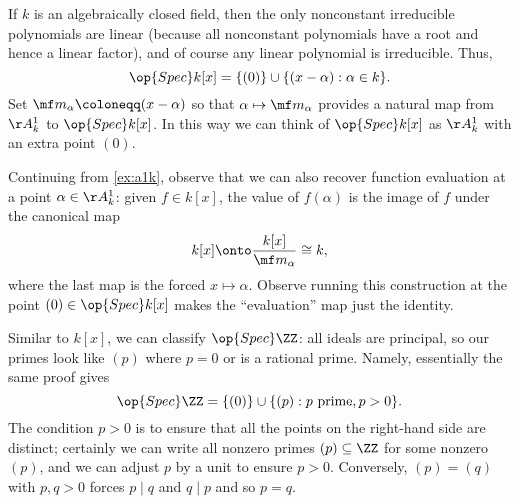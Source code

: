 \documentclass[../notes.tex]{subfiles}
\begin{document}
\begin{example} \label{ex:a1k}
	If $k$ is an algebraically closed field, then the only nonconstant irreducible polynomials are linear (because all nonconstant polynomials have a root and hence a linear factor), and of course any linear polynomial is irreducible. Thus,
	\[\op{Spec}k[x]=\{(0)\}\cup\{(x-\alpha):\alpha\in k\}.\]
	Set $\mf m_\alpha\coloneqq(x-\alpha)$ so that $\alpha\mapsto\mf m_\alpha$ provides a natural map from $\AA^1_k$ to $\op{Spec}k[x]$. In this way we can think of $\op{Spec}k[x]$ as $\AA^1_k$ with an extra point $(0)$.
\end{example}
\begin{remark} \label{rem:evaluation}
	Continuing from \autoref{ex:a1k}, observe that we can also recover function evaluation at a point $\alpha\in\AA^1_k$: given $f\in k[x]$, the value of $f(\alpha)$ is the image of $f$ under the canonical map
	\[k[x]\onto\frac{k[x]}{\mf m_\alpha}\cong k,\]
	where the last map is the forced $x\mapsto\alpha$. Observe running this construction at the point $(0)\in\op{Spec}k[x]$ makes the ``evaluation'' map just the identity.
\end{remark}
\begin{ex}
	Similar to $k[x]$, we can classify $\op{Spec}\ZZ$: all ideals are principal, so our primes look like $(p)$ where $p=0$ or is a rational prime. Namely, essentially the same proof gives
	\[\op{Spec}\ZZ=\{(0)\}\cup\{(p):p\text{ prime},p>0\}.\]
	The condition $p>0$ is to ensure that all the points on the right-hand side are distinct; certainly we can write all nonzero primes $(p)\subseteq\ZZ$ for some nonzero $(p)$, and we can adjust $p$ by a unit to ensure $p>0$. Conversely, $(p)=(q)$ with $p,q>0$ forces $p\mid q$ and $q\mid p$ and so $p=q$.
\end{ex}
\end{document}
